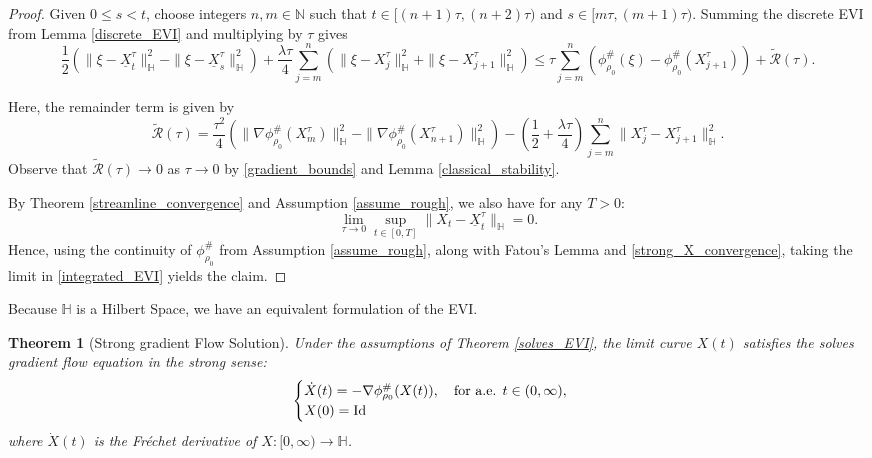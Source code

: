 \documentclass[11pt,a4paper]{amsart}
\newcommand{\1}{\mathds{1}}
\newtheorem{theorem}{\textbf{Theorem}}[section]
\numberwithin{equation}{section}
\begin{document}
\begin{proof}  
Given $0 \leq s < t$, choose integers $n, m \in \mathbb{N}$ such that $t \in [(n+1)\tau, (n+2)\tau)$ and $s \in [m \tau, (m+1)\tau)$. Summing the discrete EVI from Lemma \ref{discrete_EVI} and multiplying by $\tau$ gives
\begin{equation} 
\frac{1}{2} \left( \|\xi - \underline{X}_t^{\tau}\|^2_{\mathbb{H}} - \|\xi - \underline{X}_s^{\tau}\|^2_{\mathbb{H}} \right) 
+ \frac{\lambda \tau }{4}  \sum_{j=m}^{n} \left( \|\xi - X^{\tau}_j\|^2_{\mathbb{H}} + \|\xi - X^{\tau}_{j+1}\|^2_{\mathbb{H}} \right) \leq \tau \sum_{j=m}^{n} \left( \phi^{\#}_{\rho_0}(\xi) - \phi^{\#}_{\rho_0}(X^{\tau}_{j+1}) \right) + \tilde{\mathcal{R}}(\tau). 
\label{integrated_EVI}
\end{equation}

Here, the remainder term is given by
\[
\tilde{\mathcal{R}}(\tau) = \frac{\tau^2}{4} \left( \|\nabla \phi^{\#}_{\rho_0}(X^{\tau}_m)\|^2_{\mathbb{H}} - \|\nabla \phi^{\#}_{\rho_0}(X^{\tau}_{n+1})\|^2_{\mathbb{H}} \right) 
- \left( \frac{1}{2} + \frac{\lambda \tau}{4} \right) \sum_{j=m}^{n} \|X^{\tau}_j - X^{\tau}_{j+1}\|^2_{\mathbb{H}}.
\]  
Observe that $\tilde{\mathcal{R}}(\tau) \to 0$ as $\tau \to 0$ by \eqref{gradient_bounds} and Lemma \ref{classical_stability}. \smallskip

By Theorem \ref{streamline_convergence} and Assumption \ref{assume_rough}, we also have for any $T > 0$:
\begin{equation} 
\lim_{\tau \to 0} \sup_{t \in [0,T]} \|X_t - \underline{X}_t^{\tau}\|_{\mathbb{H}} = 0. 
\label{strong_X_convergence} 
\end{equation}
Hence, using the continuity of $\phi^{\#}_{\rho_0}$ from Assumption \ref{assume_rough}, along with Fatou's Lemma and \eqref{strong_X_convergence}, taking the limit in \eqref{integrated_EVI} yields the claim.
\end{proof}


Because $\mathbb{H}$ is a Hilbert Space, we have an equivalent formulation of the EVI.

\begin{theorem}[Strong gradient Flow Solution]  \label{strong_gf_solution}
Under the assumptions of Theorem \ref{solves_EVI}, the limit curve $X(t)$ satisfies the solves gradient flow equation in the strong sense:
\begin{equation}
\begin{cases} \dot{X}(t) = -\nabla \phi^{\#}_{\rho_0}(X(t)), \quad \text{for a.e. } t \in (0,\infty),  \\
X(0) = \textnormal{Id}
\end{cases}
\label{strong_gf_eqn}
\end{equation}
where $\dot{X}(t)$ is the Fréchet derivative of $X: [0,\infty) \to \mathbb{H}$.  
\end{theorem}
\end{document}
